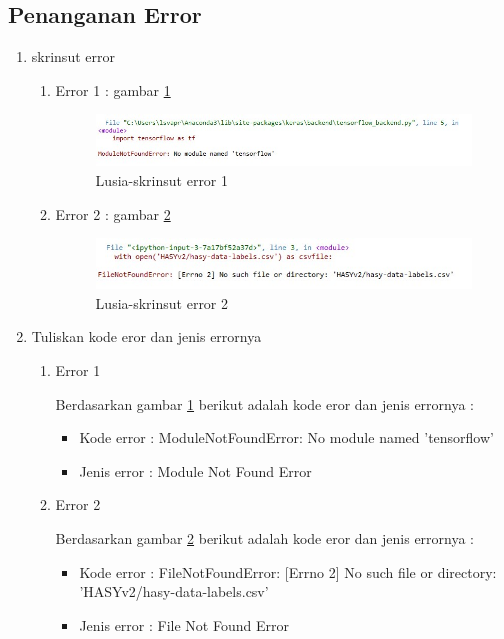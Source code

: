 \subsection{Penanganan Error}
\begin{enumerate}
	\item skrinsut error 
		\begin{enumerate}
		\item Error 1 : gambar \ref{7C1}
		\begin{figure}[!hbtp]
		\centering
		\includegraphics[scale=0.5]{figures/x1.jpg}
		\caption{Lusia-skrinsut error 1}
		\label{7C1}
		\end{figure}
		\item Error 2 : gambar \ref{7C2}
		\begin{figure}[!hbtp]
		\centering
		\includegraphics[scale=0.5]{figures/x2.jpg}
		\caption{Lusia-skrinsut error 2}
		\label{7C2}
		\end{figure}
		\end{enumerate}
	\item Tuliskan kode eror dan jenis errornya
		\begin{enumerate}
		\item Error 1
			\par Berdasarkan gambar \ref{7C1} berikut adalah kode eror dan jenis errornya :
			\begin{itemize}
			\item Kode error : ModuleNotFoundError: No module named 'tensorflow'
			\item Jenis error : Module Not Found Error
			\end{itemize}
		\item Error 2
			\par Berdasarkan gambar \ref{7C2} berikut adalah kode eror dan jenis errornya :
			\begin{itemize}
			\item Kode error : FileNotFoundError: [Errno 2] No such file or directory: 'HASYv2/hasy-data-labels.csv'
			\item Jenis error : File Not Found Error

\end{itemize}
\end{enumerate}
\end{enumerate}
